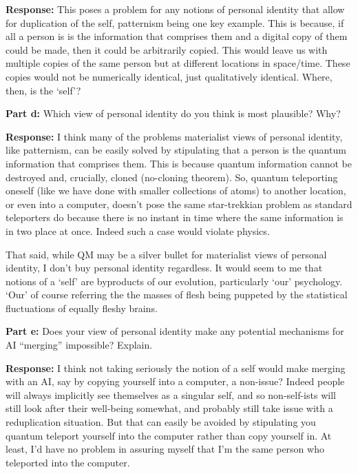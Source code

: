 \documentclass{article}
\begin{document}
\noindent\textbf{Response:} This poses a problem for any notions of personal identity that allow for duplication of the self, patternism being one key example. This is because, if all a person is is the information that comprises them and a digital copy of them could be made, then it could be arbitrarily copied. This would leave us with multiple copies of the same person but at different locations in space/time. These copies would not be numerically identical, just qualitatively identical. Where, then, is the `self'?
\bigskip

\noindent\textbf{Part d:} Which view of personal identity do you think is most plausible? Why?
\bigskip

\noindent\textbf{Response:} I think many of the problems materialist views of personal identity, like patternism, can be easily solved by stipulating that a person is the quantum information that comprises them. This is because quantum information cannot be destroyed and, crucially, cloned (no-cloning theorem). So, quantum teleporting oneself (like we have done with smaller collections of atoms) to another location, or even into a computer, doesn't pose the same star-trekkian problem as standard teleporters do because there is no instant in time where the same information is in two place at once. Indeed such a case would violate physics.

That said, while QM may be a silver bullet for materialist views of personal identity, I don't buy personal identity regardless. It would seem to me that notions of a `self' are byproducts of our evolution, particularly `our' psychology. `Our' of course referring the the masses of flesh being puppeted by the statistical fluctuations of equally fleshy brains.
\bigskip

\noindent\textbf{Part e:} Does your view of personal identity make any potential mechanisms for AI ``merging'' impossible? Explain.
\bigskip

\noindent\textbf{Response:} I think not taking seriously the notion of a self would make merging with an AI, say by copying yourself into a computer, a non-issue? Indeed people will always implicitly see themselves as a singular self, and so non-self-ists will still look after their well-being somewhat, and probably still take issue with a reduplication situation. But that can easily be avoided by stipulating you quantum teleport yourself into the computer rather than copy yourself in. At least, I'd have no problem in assuring myself that I'm the same person who teleported into the computer.
\bigskip
\end{document}

